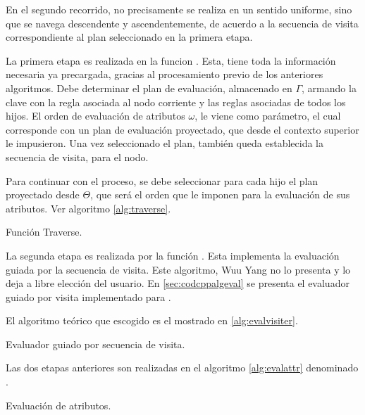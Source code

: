 En el segundo recorrido, no precisamente se realiza en un sentido uniforme, sino que se navega descendente y ascendentemente, de acuerdo a la secuencia de visita correspondiente al plan seleccionado en la primera etapa. 

La primera etapa es realizada en la funcion . Esta, tiene toda la información necesaria ya precargada, gracias al procesamiento previo de los anteriores algoritmos. Debe determinar el plan de evaluación, almacenado en $\Gamma$, armando la clave con la regla asociada al nodo corriente y las reglas asociadas de todos los hijos. El orden de evaluación de atributos $\omega$, le viene como parámetro, el cual corresponde con un plan de evaluación proyectado, que desde el contexto superior le impusieron. Una vez seleccionado el plan, también queda establecida la secuencia de visita, para el nodo.

Para continuar con el proceso, se debe seleccionar para cada hijo el plan proyectado desde $\Theta$, que será el orden que le imponen para la evaluación de sus atributos. Ver algoritmo \ref{alg:traverse}.

\begin{algorithm}[!ht]

\vspace{-0.5cm}
\caption{\label{alg:traverse}Función Traverse.}
\end{algorithm}

La segunda etapa es realizada por la función . Esta implementa la evaluación guiada por la secuencia de visita. Este algoritmo, Wuu Yang no lo presenta y lo deja a libre elección del usuario. En \ref{sec:codcppalgeval} se presenta el evaluador guiado por visita implementado para \maggen. 

El algoritmo teórico que escogido es el mostrado en \ref{alg:evalvisiter}.

\begin{algorithm}[!ht]

\vspace{-0.5cm}
\caption{\label{alg:evalvisiter}Evaluador guiado por secuencia de visita.}
\end{algorithm}

Las dos etapas anteriores son realizadas en el algoritmo \ref{alg:evalattr} denominado . 

\begin{algorithm}[!ht]

\vspace{-0.5cm}
\caption{\label{alg:evalattr}Evaluación de atributos.}
\end{algorithm}